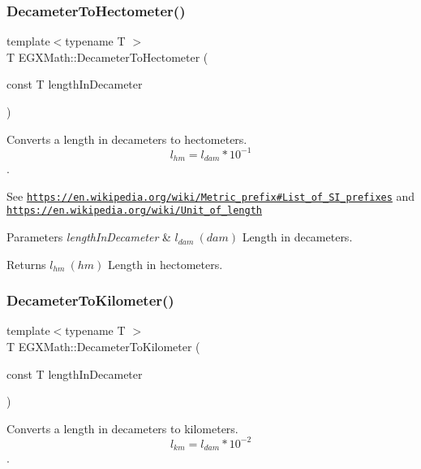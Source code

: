 \subsubsection{\texorpdfstring{Decameter\+To\+Hectometer()}{DecameterToHectometer()}}
{\footnotesize\ttfamily template$<$typename T $>$ \\
T E\+G\+X\+Math\+::\+Decameter\+To\+Hectometer (\begin{DoxyParamCaption}\item[{const T}]{length\+In\+Decameter }\end{DoxyParamCaption})}



Converts a length in decameters to hectometers. \[ l_{hm}=l_{dam} * 10^{-1} \]. 

See \href{https://en.wikipedia.org/wiki/Metric_prefix#List_of_SI_prefixes}{\tt https\+://en.\+wikipedia.\+org/wiki/\+Metric\+\_\+prefix\#\+List\+\_\+of\+\_\+\+S\+I\+\_\+prefixes} and \href{https://en.wikipedia.org/wiki/Unit_of_length}{\tt https\+://en.\+wikipedia.\+org/wiki/\+Unit\+\_\+of\+\_\+length} 
\begin{DoxyParams}{Parameters}
{\em length\+In\+Decameter} & $ l_{dam}\ (dam)$ Length in decameters. \\
\hline
\end{DoxyParams}
\begin{DoxyReturn}{Returns}
$ l_{hm}\ (hm)$ Length in hectometers. 
\end{DoxyReturn}
\mbox{\label{group___e_g_x_math-_conversions-_length_conversions-_s_i-_decameter-_s_i_gaecb6cb385676cad8430d23e529e4a59e}} 
\subsubsection{\texorpdfstring{Decameter\+To\+Kilometer()}{DecameterToKilometer()}}
{\footnotesize\ttfamily template$<$typename T $>$ \\
T E\+G\+X\+Math\+::\+Decameter\+To\+Kilometer (\begin{DoxyParamCaption}\item[{const T}]{length\+In\+Decameter }\end{DoxyParamCaption})}



Converts a length in decameters to kilometers. \[ l_{km}=l_{dam} * 10^{-2} \]. 

